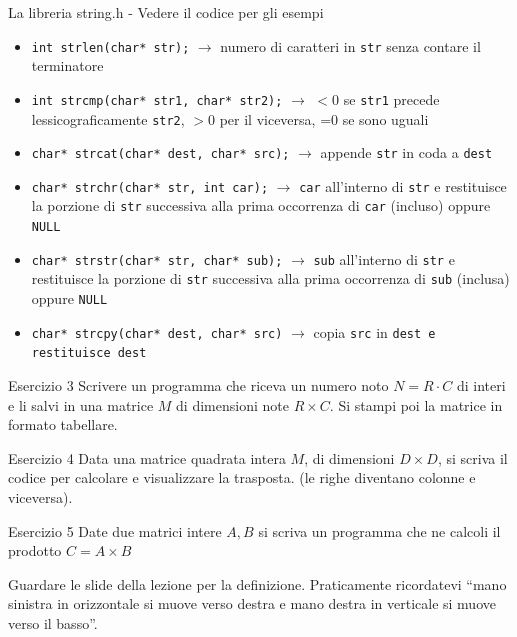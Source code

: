 \documentclass[format=169]{beamer}
\begin{document}
\begin{frame}{La libreria string.h - Vedere il codice per gli esempi}
\begin{itemize}
	\item \texttt{int strlen(char* str);} $\rightarrow$ numero di caratteri in \texttt{str} senza contare il terminatore
	\item \texttt{int strcmp(char* str1, char* str2);} $\rightarrow$ $<$0 se \texttt{str1} precede lessicograficamente \texttt{str2}, $>$0 per il viceversa, =0 se sono uguali
	\item \texttt{char* strcat(char* dest, char* src);} $\rightarrow$ appende \texttt{str} in coda a \texttt{dest}
	\item \texttt{char* strchr(char* str, int car);} $\rightarrow$ \texttt{car} all'interno di \texttt{str} e restituisce la porzione di \texttt{str} successiva alla prima occorrenza di \texttt{car} (incluso) oppure \texttt{NULL}
	\item \texttt{char* strstr(char* str, char* sub);} $\rightarrow$ \texttt{sub} all'interno di \texttt{str} e restituisce la porzione di \texttt{str} successiva alla prima occorrenza di \texttt{sub} (inclusa) oppure \texttt{NULL}
	\item \texttt{char* strcpy(char* dest, char* src)} $\rightarrow$ copia \texttt{src} in \texttt{dest e restituisce \texttt{dest}}
\end{itemize}
\end{frame}

\begin{frame}{Esercizio 3}
Scrivere un programma che riceva un numero noto $N=R\cdot C$ di interi e li salvi in una matrice $M$ di dimensioni note $R \times C$. Si stampi poi la matrice in formato tabellare.
\end{frame}

\begin{frame}{Esercizio 4}
Data una matrice quadrata intera $M$, di dimensioni $D \times D$, si scriva il codice per calcolare e visualizzare la trasposta. (le righe diventano colonne e viceversa).
\end{frame}

\begin{frame}{Esercizio 5}
Date due matrici intere $A, B$ si scriva un programma che ne calcoli il prodotto $C=A\times B$

Guardare le slide della lezione per la definizione. Praticamente ricordatevi ``mano sinistra in orizzontale si muove verso destra e mano destra in verticale si muove verso il basso''.
\end{frame}
\end{document}
